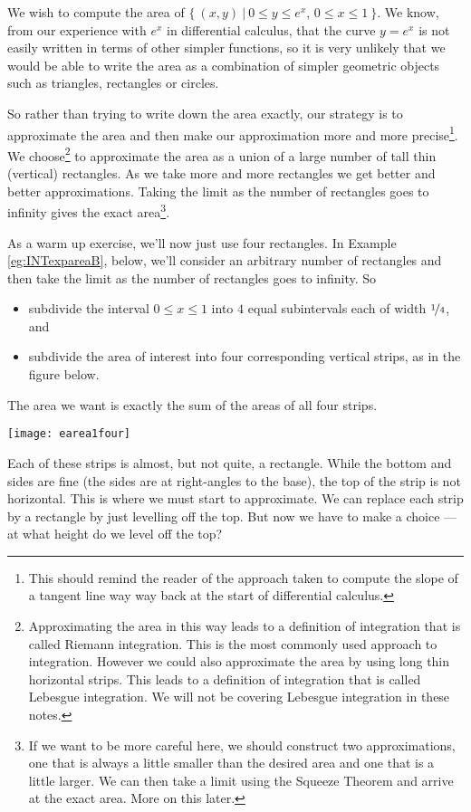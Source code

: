 \begin{eg}\label{eg:INTexparea}
We wish to compute the area of $\big\{\ (x,y)\ \big|\ 0\le y\le e^x$, $0\le x\le
1\ \big\}$. We know, from our experience with $e^x$ in differential calculus,
that the curve $y=e^x$ is not easily written in terms of other simpler
functions, so it is very unlikely that we would be able to write the area as
a combination of simpler geometric objects such as triangles, rectangles or
circles.

So rather than trying to write down the area exactly, our strategy is to
approximate the area and then make our approximation more and more
precise\footnote{This should remind the reader of the approach taken to compute
the slope of a tangent line way way back at the start of differential
calculus.}. We choose\footnote{Approximating the area in this way leads to a
definition of integration that is called Riemann integration. This is the most
commonly used approach to integration. However we could also approximate the
area by using long thin horizontal strips. This leads to a definition of
integration that is called Lebesgue integration. We will not be covering
Lebesgue integration in these notes.} to approximate the area as a union of a
large number of tall thin (vertical) rectangles. As we take more and more
rectangles we get better and better approximations. Taking the limit as the
number of rectangles goes to infinity gives the exact area\footnote{If we want
to be more careful here, we should construct two approximations, one that is
always a little smaller than the desired area and one that is a little larger.
We can then take a limit using the Squeeze Theorem and arrive at the
exact area. More on this later.}.

As a warm up exercise, we'll now just use four rectangles. In Example
\ref{eg:INTexpareaB}, below, we'll consider an arbitrary number of rectangles
and then take the limit as the number of rectangles goes to infinity. So
\begin{itemize}
\item subdivide the interval $0\le x\le 1$ into $4$ equal subintervals
each of width $\nicefrac{1}{4}$, and
\item subdivide the area of interest into four corresponding
vertical strips, as in the figure below.
\end{itemize}
The area we want is exactly the sum of the areas of all four strips.
\begin{efig}
\begin{center}
   \texttt{[image: earea1four]}
\end{center}
\end{efig}
Each of these strips is almost, but not quite, a rectangle. While the bottom and
sides are fine (the sides are at right-angles to the base), the top of the strip
is not horizontal. This is where we must start to approximate. We can replace
each strip by a rectangle by just levelling off the top. But now we have to make
a choice --- at what height do we level off the top?


\end{eg}
